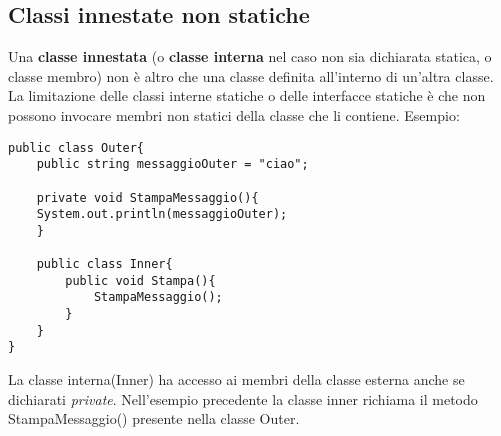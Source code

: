 \subsection{Classi innestate non statiche}
Una \textbf{classe innestata} (o \textbf{classe interna} nel caso non sia dichiarata statica, o classe membro) non è altro che una classe definita all'interno di un'altra classe.
La limitazione delle classi interne statiche o delle interfacce statiche è che non possono invocare membri non statici della classe che li contiene. 
Esempio:
\begin{lstlisting}
public class Outer{
	public string messaggioOuter = "ciao";

	private void StampaMessaggio(){
	System.out.println(messaggioOuter);
	}

	public class Inner{
		public void Stampa(){
			StampaMessaggio();
		}
	}
}
\end{lstlisting}
La classe interna(Inner) ha accesso ai membri della classe esterna anche se dichiarati \textit{private}. Nell'esempio precedente la classe inner richiama il metodo StampaMessaggio() presente nella classe Outer.


